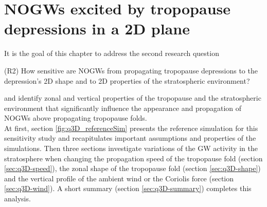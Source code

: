 \chapter{NOGWs excited by tropopause depressions in a 2D plane}
\label{sec:resultsQ3D}
It is the goal of this chapter to address the second research question
\begin{tcolorbox}[]
    (R2) How sensitive are NOGWs from propagating tropopause depressions to the depression's 2D shape and to 2D properties of the stratospheric environment?
\end{tcolorbox}
\noindent and identify zonal and vertical properties of the tropopause and the stratospheric environment that significantly influence the appearance and propagation of NOGWs above propagating tropopause folds. \\
At first, section \ref{fig:q3D_referenceSim} presents the reference simulation for this sensitivity study and recapitulates important assumptions and properties of the simulations. Then three sections investigate variations of the GW activity in the stratosphere when changing the propagation speed of the tropopause fold (section \ref{sec:q3D-speed}), the zonal shape of the tropopause fold (section \ref{sec:q3D-shape}) and the vertical profile of the ambient wind or the Coriolis force (section \ref{sec:q3D-wind}). A short summary (section \ref{sec:q3D-summary}) completes this analysis. 

